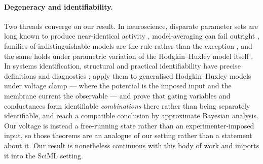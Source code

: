 \documentclass{article}
\begin{document}
\paragraph{Degeneracy and identifiability.}
Two threads converge on our result. In neuroscience, disparate parameter sets
are long known to produce near-identical activity \citep{prinz2004},
model-averaging can fail outright \citep{golowasch2002}, families of
indistinguishable models are the rule rather than the exception
\citep{marder2011}, and the same holds under parametric variation of the
Hodgkin--Huxley model itself \citep{ori2018}. In systems identification,
structural and practical identifiability have precise definitions and diagnostics
\citep{raue2009, wieland2021}; \citet{walch2016} apply them to generalised
Hodgkin--Huxley models under voltage clamp --- where the potential is the imposed input and the membrane current the observable --- and prove that gating variables and conductances form
identifiable \emph{combinations} there rather than being separately identifiable, and
\citet{daly2015} reach a compatible conclusion by approximate Bayesian analysis.
Our voltage is instead a free-running state rather than an experimenter-imposed input, so those theorems are an analogue of our setting rather than a statement about it. Our result is nonetheless continuous with this body of work and imports it into the SciML
setting.
\end{document}
